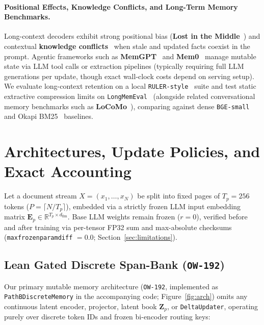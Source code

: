 \documentclass[10pt]{article}
\newcommand{\vect}[1]{\mathbf{#1}}
\renewcommand{\_}{\origunderscore\allowbreak}
\begin{document}
\paragraph{Positional Effects, Knowledge Conflicts, and Long-Term Memory Benchmarks.}
Long-context decoders exhibit strong positional bias (\textbf{Lost in the Middle}~\citep{liu2024lost}) and contextual \textbf{knowledge conflicts}~\citep{longpre2021conflict} when stale and updated facts coexist in the prompt. Agentic frameworks such as \textbf{MemGPT}~\citep{packer2023memgpt} and \textbf{Mem0}~\citep{chhikara2025mem0} manage mutable state via LLM tool calls or extraction pipelines (typically requiring full LLM generations per update, though exact wall-clock costs depend on serving setup). We evaluate long-context retention on a local \texttt{RULER-style}~\citep{hsieh2024ruler} suite and test static extractive compression limits on \texttt{LongMemEval}~\citep{wu2025longmemeval} (alongside related conversational memory benchmarks such as \textbf{LoCoMo}~\citep{maharana2024locomo}), comparing against dense \texttt{BGE-small}~\citep{xiao2024bge} and Okapi BM25~\citep{robertson2009bm25} baselines.

\section{Architectures, Update Policies, and Exact Accounting}
\label{sec:method}

Let a document stream $X = (x_1, \dots, x_N)$ be split into fixed pages of $T_p = 256$ tokens ($P = \lceil N/T_p \rceil$), embedded via a strictly frozen LLM input embedding matrix $\vect{E}_p \in \mathbb{R}^{T_p \times d_{\text{llm}}}$. Base LLM weights remain frozen ($r=0$), verified before and after training via per-tensor FP32 sum and max-absolute checksums (\texttt{max\_frozen\_param\_diff} $= 0.0$; Section~\ref{sec:limitations}).

\subsection{Lean Gated Discrete Span-Bank (\texttt{OW-192})}
Our primary mutable memory architecture (\texttt{OW-192}, implemented as \texttt{PathBDiscreteMemory} in the accompanying code; Figure~\ref{fig:arch}) omits any continuous latent encoder, projector, latent book $\vect{Z}_p$, or \texttt{DeltaUpdater}, operating purely over discrete token IDs and frozen bi-encoder routing keys:
\end{document}
